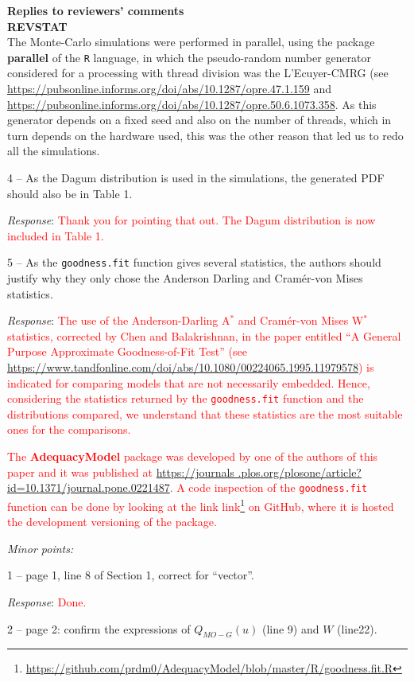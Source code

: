 \documentclass[version=last,12pt,{"maintainersDelight"}]{scrlttr2}
\renewcommand{\href}[2]{#2\footnote{\url{#1}}}
\begin{document}
\begin{letter}{\textbf{Replies to reviewers' comments}\\\textbf{REVSTAT}\\}
{The Monte-Carlo simulations were performed in parallel, using the package \textbf{parallel} of the \texttt{R} language, in which the pseudo-random number generator considered for a processing with thread division was the L'Ecuyer-CMRG (see \url{https://pubsonline.informs.org/doi/abs/10.1287/opre.47.1.159} and \url{https://pubsonline.informs.org/doi/abs/10.1287/opre.50.6.1073.358}. As this generator depends on a fixed seed and also on the number of threads, which in turn depends on the hardware used, this was the other reason that led us to redo all the simulations.}

4 -- As the Dagum distribution is used in the simulations, the generated PDF should also be in Table 1.

\emph{Response}:
\textcolor{red}{Thank you for pointing that out. The Dagum distribution is now included in Table 1.}

5 -- As the \texttt{goodness.fit} function gives several statistics, the authors should justify why they only chose the Anderson Darling and Cram\'er-von Mises statistics.

\emph{Response}:
\textcolor{red}{The use of the Anderson-Darling  A$^*$ and Cram\'er-von Mises W$^*$  statistics, corrected by Chen and Balakrishnan, in the paper entitled ``A General Purpose Approximate Goodness-of-Fit Test'' (see   \url{https://www.tandfonline.com/doi/abs/10.1080/00224065.1995.11979578}) is indicated for comparing mo\-dels that are not necessarily embedded. Hence, considering the statistics returned by the \texttt{goodness.fit} function and the distributions compared, we understand that these statistics are the most suitable ones for 
the comparisons.}

\textcolor{red}{The \textbf{AdequacyModel} package was developed 
by one of the authors of this paper and it was published at \url{https://journals .plos.org/plosone/article?id=10.1371/journal.pone.0221487}. 
A code inspection of the \texttt{goodness.fit} function can be done by looking at the link   \href{https://github.com/prdm0/AdequacyModel/blob/master/R/goodness.fit.R}{link} on GitHub, where it is hosted the development versioning of the package.}

\emph{Minor points:}

1 -- page 1, line 8 of Section 1, correct for ``vector''.

\emph{Response}: \textcolor{red}{Done.}

2 -- page 2: confirm the expressions of \(Q_{MO-G}(u)\) (line 9) and
\(W\) (line22).


\end{letter}
\end{document}
